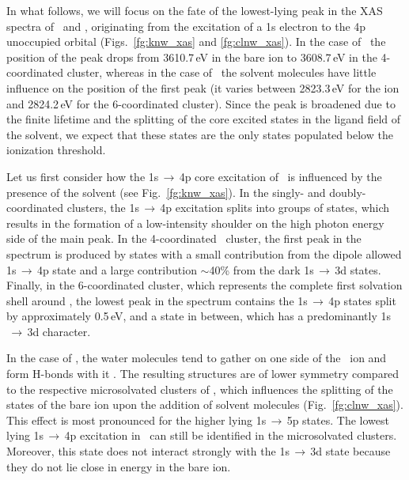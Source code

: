 


In what follows, we will focus on the fate of the lowest-lying peak in the XAS spectra of \ki~and \cli, originating from the excitation of a 1s electron to the 4p unoccupied orbital (Figs.\ \ref{fg:knw_xas} and \ref{fg:clnw_xas}). In the case of \ki~the position of the peak drops from 3610.7\,eV in the bare ion to 3608.7\,eV in the 4-coordinated cluster, whereas in the case of \cli~the solvent molecules have little influence on the position of the first peak (it varies between 2823.3\,eV for the ion and 2824.2\,eV for the 6-coordinated cluster). Since the peak is broadened due to the finite lifetime and the splitting of the core excited states in the ligand field of the solvent, we expect that these states are the only states populated below the ionization threshold.


Let us first consider how the 1s$\,\rightarrow\,$4p core excitation of \ki~is influenced by the presence of the solvent (see Fig.\ \ref{fg:knw_xas}). In the singly- and doubly-coordinated clusters, the 1s$\,\rightarrow\,$4p excitation splits into groups of states, which results in the formation of a low-intensity shoulder on the high photon energy side of the main peak. In the 4-coordinated \ki~cluster, the first peak in the spectrum is produced by states with a small contribution from the dipole allowed 1s$\,\rightarrow\,$4p state and a large contribution $\sim$40\% from the dark 1s$\,\rightarrow\,$3d states. Finally, in the 6-coordinated cluster, which represents the complete first solvation shell around \ki, the lowest peak in the spectrum contains the 1s$\,\rightarrow\,$4p states split by approximately 0.5\,eV, and a state in between, which has a predominantly 1s$\,\rightarrow\,$3d character.


In the case of \cli, the water molecules tend to gather on one side of the \cli~ion and form H-bonds with it \citep{ge13:13169}. The resulting structures are of lower symmetry compared to the respective microsolvated clusters of \ki, which influences the splitting of the states of the bare ion upon the addition of solvent molecules (Fig.\ \ref{fg:clnw_xas}). This effect is most pronounced for the higher lying 1s$\,\rightarrow\,$5p states. The lowest lying 1s$\,\rightarrow\,$4p excitation in \cli~can still be identified in the microsolvated clusters. Moreover, this state does not interact strongly with the 1s$\,\rightarrow\,$3d state because they do not lie close in energy in the bare ion.


